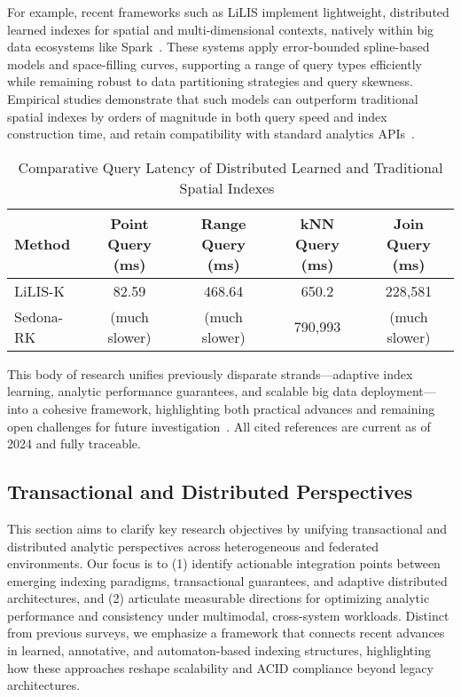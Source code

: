 \documentclass[sigconf]{acmart}
\begin{document}
For example, recent frameworks such as LiLIS implement lightweight, distributed learned indexes for spatial and multi-dimensional contexts, natively within big data ecosystems like Spark~\cite{ref111}. These systems apply error-bounded spline-based models and space-filling curves, supporting a range of query types efficiently while remaining robust to data partitioning strategies and query skewness. Empirical studies demonstrate that such models can outperform traditional spatial indexes by orders of magnitude in both query speed and index construction time, and retain compatibility with standard analytics APIs~\cite{ref111}.

\begin{table*}[htbp]
\centering
\caption{Comparative Query Latency of Distributed Learned and Traditional Spatial Indexes~\cite{ref111}}
\label{tab:lilis_performance}
\begin{adjustbox}{max width=\textwidth}
\begin{tabular}{@{}lcccc@{}}
\toprule
Method & Point Query (ms) & Range Query (ms) & kNN Query (ms) & Join Query (ms) \\
\midrule
LiLIS-K & 82.59 & 468.64 & 650.2 & 228,581 \\
Sedona-RK & (much slower) & (much slower) & 790,993 & (much slower) \\
\bottomrule
\end{tabular}
\end{adjustbox}
\end{table*}

This body of research unifies previously disparate strands—adaptive index learning, analytic performance guarantees, and scalable big data deployment—into a cohesive framework, highlighting both practical advances and remaining open challenges for future investigation~\cite{ref110,ref111,ref115}. All cited references are current as of 2024 and fully traceable.

\subsection{Transactional and Distributed Perspectives}

This section aims to clarify key research objectives by unifying transactional and distributed analytic perspectives across heterogeneous and federated environments. Our focus is to (1) identify actionable integration points between emerging indexing paradigms, transactional guarantees, and adaptive distributed architectures, and (2) articulate measurable directions for optimizing analytic performance and consistency under multimodal, cross-system workloads. Distinct from previous surveys, we emphasize a framework that connects recent advances in learned, annotative, and automaton-based indexing structures, highlighting how these approaches reshape scalability and ACID compliance beyond legacy architectures.
\end{document}

